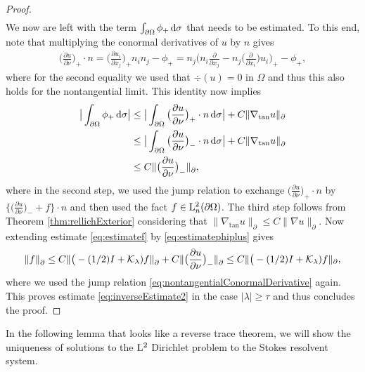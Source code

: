 \begin{proof}
\begin{align}
  \end{align}
  We now are left with the term $\int_{\partial\Omega} \phi_+ \, {\operatorname{d}\!{\sigma}}$ that needs to be estimated.
  To this end, note that multiplying the conormal derivatives of $u$ by $n$ gives
  \begin{align*}
    \big( \frac{\partial u}{\partial \nu} \big)_+ \cdot n
    = \big( \frac{\partial u_i}{\partial x_j}\big)_+ n_i n_j - \phi_+
    = n_j \big( n_i \frac{\partial}{\partial x_j} - n_j \big( \frac{\partial}{\partial x_i} \big) u_i \big)_+ - \phi_+,
  \end{align*}
  where for the second equality we used that $\div(u) = 0$ in $\Omega$ and thus this also holds for the nontangential limit.
  This identity now implies
  \begin{align}
    \big| \int_{\partial\Omega} \phi_+ \, {\operatorname{d}\!{\sigma}} \big|
    &\leq \big| \int_{\partial\Omega} \big( \frac{\partial u}{\partial \nu} \big)_+ \cdot n \, {\operatorname{d}\!{\sigma}} \big|  + C \|\nabla_{\mathrm{tan}} u \|_{\partial} \nonumber\\
    &\leq \big| \int_{\partial\Omega} \big( \frac{\partial u}{\partial \nu} \big)_- \cdot n \, {\operatorname{d}\!{\sigma}} \big| + C \| \nabla_{\mathrm{tan}} u\|^{}_\partial \nonumber\\
    \label{eq:estimatephiplus}
    &\leq C \| \big( \frac{\partial u}{\partial \nu} \big)_- \|^{}_\partial,
  \end{align}
  where in the second step, we used the jump relation to exchange $\big(\frac{\partial u}{\partial \nu}\big)_+ \cdot n$ by $\big\{ \big(\frac{\partial u}{\partial \nu} \big)_- + f \big\} \cdot n$ and then used the fact $f \in \mathrm{L}^2_n(\partial\Omega)$.
  The third step follows from Theorem \ref{thm:rellichExterior} considering that $\|\nabla_{\mathrm{tan}} u \|^{}_\partial \leq C \|\nabla u \|_{\partial}$.
  Now extending estimate \eqref{eq:estimatef} by \eqref{eq:estimatephiplus} gives
  \begin{align*}
    \| f\|^{}_\partial 
    \leq C \| \big( - (1/2) I + \mathcal{K}_\lambda) f \|^{}_\partial + C \| \big(\frac{\partial u}{\partial \nu} \big)_- \|^{}_\partial 
    \leq C \| \big( - (1/2) I + \mathcal{K}_\lambda) f\|_{\partial},
  \end{align*}
  where we used the jump relation \eqref{eq:nontangentialConormalDerivative} again.
  This proves estimate \eqref{eq:inverseEstimate2} in the case $|\lambda| \geq \tau$ and thus concludes the proof.
\end{proof}

In the following lemma that looks like a reverse trace theorem, we will show the uniqueness of solutions to the $\mathrm{L}^2$ Dirichlet problem to the Stokes resolvent system.

